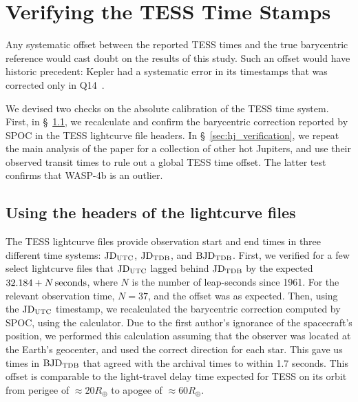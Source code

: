 \documentclass[12pt,twocolumn,tighten]{aastex62}
\begin{document}

\clearpage
\newpage

\appendix

\section{Verifying the TESS Time Stamps}
\label{sec:verify_tess}

Any systematic offset between the reported TESS
times and the true barycentric reference would cast doubt on the
results of this study.  Such an offset would have historic precedent:
Kepler had a systematic error in its timestamps that was corrected
only in Q14~\citep[][Section 3.4]{kepler_DR19_2013}.

We devised two checks on the absolute calibration of the TESS time
system.  First, in \S~\ref{sec:headers}, we recalculate and confirm
the barycentric correction reported by SPOC in the TESS lightcurve
file headers.  In \S~\ref{sec:hj_verification}, we repeat the main
analysis of the paper for a collection of other hot Jupiters, and use
their observed transit times to rule out a global TESS time offset.
The latter test confirms that WASP-4b is an outlier.

\subsection{Using the headers of the lightcurve files}
\label{sec:headers}

The TESS lightcurve files provide observation start and end times in
three different time systems: ${\rm JD}_{\rm UTC}$, ${\rm JD}_{\rm
TDB}$, and ${\rm BJD}_{\rm TDB}$.
First, we verified for a few select lightcurve files that ${\rm
JD}_{\rm UTC}$ lagged behind ${\rm JD}_{\rm TDB}$ by the expected
$32.184 + N\,{\rm seconds}$, where $N$ is the number of leap-seconds
since 1961. For the relevant observation time, $N=37$, and the offset
was as expected.
Then, using the ${\rm JD}_{\rm UTC}$ timestamp, we recalculated the
barycentric correction computed by SPOC, using the
\citealt{eastman_achieving_2010} calculator.  Due to the first
author's ignorance of the spacecraft's position, we performed this
calculation assuming that the observer was located at the Earth's
geocenter, and used the correct direction for each star.  This gave us
times in ${\rm BJD}_{\rm TDB}$ that agreed with the archival times to
within 1.7 seconds.  This offset is comparable to the light-travel
delay time expected for TESS on its orbit from perigee of $\approx
20R_\oplus$ to apogee of $\approx 60R_\oplus$.
\end{document}
